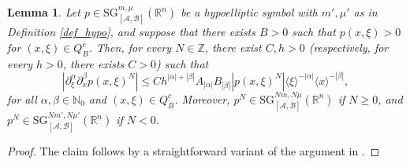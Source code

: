 \documentclass[11pt,reqno]{amsart}
\numberwithin{equation}{section}
\newtheorem{lemma}[theorem]{Lemma}
\newcommand{\R}{{\mathbb{R}}} %
\newcommand{\Z}{{\mathbb{Z}}} %
\newcommand{\N}{{\mathbb{N}}} %
\newcommand{\SG}{{\mathrm{SG}}}
\newcommand{\A}{{\mathcal{A}}} %
\newcommand{\B}{{\mathcal{B}}} %
\begin{document}
\begin{lemma}\label{lemma_1.3.5}
	Let $p\in {\SG}_{[\A,\B]}^{m,\mu}(\R^n)$ be a hypoelliptic symbol with $m',\mu'$ as in Definition \ref{def_hypo}, and suppose that there exists $B>0$ such that $p(x,\xi)>0$ for $(x,\xi)\in Q_B^c$. Then, for every $N\in\Z$, there exist $C,h>0$ (respectively, for every $h>0$, there exists $C>0$) such that
	\begin{equation*}
		|\partial_\xi^\alpha\partial_x^\beta p(x,\xi)^N|\leq Ch^{|\alpha|+|\beta|}A_{|\alpha|}B_{|\beta|}|p(x,\xi)^N|\langle\xi\rangle^{-|\alpha|}\langle x\rangle^{-|\beta|},
	\end{equation*}
	for all $\alpha,\beta\in\N_0$ and $(x,\xi)\in Q_B^c$. Moreover, $p^N\in {\SG}_{[\A,\B]}^{Nm, N\mu}(\R^n)$ if $N\geq 0$, and 
	$p^N\in {\SG}_{[\A,\B]}^{Nm',N\mu'}(\R^n)$ if $N<0$.
\end{lemma}
%
\begin{proof}
	The claim follows by a straightforward variant of the argument in \cite[Lemma 1.3.5]{NicRod}.
\end{proof}
\end{document}

